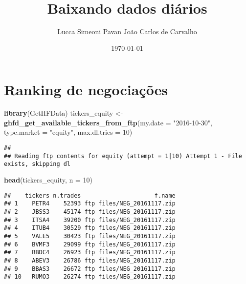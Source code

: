 \documentclass[]{article}
\title{Baixando dados diários}
\author{Lucca Simeoni Pavan \hspace{1cm} João Carlos de Carvalho}
\date{\today}
\newenvironment{Shaded}{\begin{snugshade}}{\end{snugshade}}
\newcommand{\KeywordTok}[1]{\textcolor[rgb]{0.13,0.29,0.53}{\textbf{{#1}}}}
\newcommand{\DataTypeTok}[1]{\textcolor[rgb]{0.13,0.29,0.53}{{#1}}}
\newcommand{\DecValTok}[1]{\textcolor[rgb]{0.00,0.00,0.81}{{#1}}}
\newcommand{\StringTok}[1]{\textcolor[rgb]{0.31,0.60,0.02}{{#1}}}
\newcommand{\OtherTok}[1]{\textcolor[rgb]{0.56,0.35,0.01}{{#1}}}
\newcommand{\NormalTok}[1]{{#1}}
\begin{document}
\maketitle

{
\setcounter{tocdepth}{2}
\tableofcontents
}
\begin{Shaded}
\end{Shaded}

\section{Ranking de negociações}\label{ranking-de-negociacoes}

\begin{Shaded}
\begin{Highlighting}[]
\KeywordTok{library}\NormalTok{(GetHFData)}
\NormalTok{tickers_equity <-}\StringTok{ }\KeywordTok{ghfd_get_available_tickers_from_ftp}\NormalTok{(}\DataTypeTok{my.date =} \StringTok{"2016-10-30"}\NormalTok{, }
    \DataTypeTok{type.market =} \StringTok{"equity"}\NormalTok{, }\DataTypeTok{max.dl.tries =} \DecValTok{10}\NormalTok{)}
\end{Highlighting}
\end{Shaded}

\begin{verbatim}
## 
## Reading ftp contents for equity (attempt = 1|10) Attempt 1 - File exists, skipping dl
\end{verbatim}

\begin{Shaded}
\begin{Highlighting}[]
\KeywordTok{head}\NormalTok{(tickers_equity, }\DataTypeTok{n =} \DecValTok{10}\NormalTok{)}
\end{Highlighting}
\end{Shaded}

\begin{verbatim}
##    tickers n.trades                     f.name
## 1    PETR4    52393 ftp files/NEG_20161117.zip
## 2    JBSS3    45174 ftp files/NEG_20161117.zip
## 3    ITSA4    39200 ftp files/NEG_20161117.zip
## 4    ITUB4    30529 ftp files/NEG_20161117.zip
## 5    VALE5    30423 ftp files/NEG_20161117.zip
## 6    BVMF3    29099 ftp files/NEG_20161117.zip
## 7    BBDC4    26923 ftp files/NEG_20161117.zip
## 8    ABEV3    26786 ftp files/NEG_20161117.zip
## 9    BBAS3    26672 ftp files/NEG_20161117.zip
## 10   RUMO3    26274 ftp files/NEG_20161117.zip
\end{verbatim}
\end{document}
